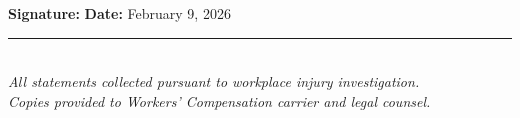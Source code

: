 \documentclass[11pt]{article}
\begin{document}
\vspace{1em}

\noindent\textbf{Signature:} \underline{\hspace{5cm}} \hfill \textbf{Date:} February 9, 2026

\vspace{2em}

\begin{center}
\rule{10cm}{0.4pt}\\[1em]
\small\textit{All statements collected pursuant to workplace injury investigation.\\
Copies provided to Workers' Compensation carrier and legal counsel.}
\end{center}
\end{document}
